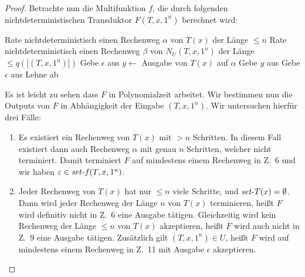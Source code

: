 \begin{proof}
    Betrachte nun die Multifunktion $f$, die durch folgenden nichtdeterministischen Transduktor $F(T, x, 1^n)$ berechnet wird:\par
    \begin{algorithm}[H]
        Rate nichtdeterministisch einen Rechenweg $\alpha$ von $T(x)$ der Länge $\leq n$\;
        Rate nichtdeterministisch einen Rechenweg $\beta$ von $N_U(T, x, 1^n)$ der Länge $\leq q(|(T, x, 1^n)|)$\;
        {
            Gebe $\epsilon$ aus\;
        }
        {
            $y\gets $ Ausgabe von $T(x)$ auf $\alpha$\;
            Gebe $y$ aus\;
        }
        {
            Gebe $\epsilon$ aus\;
        }
        \Else
        {
            Lehne ab\;
        }
    \end{algorithm}
    Es ist leicht zu sehen dass $F$ in Polynomialzeit arbeitet. 
    Wir bestimmen nun die Outputs von $F$  in Abhängigkeit der Eingabe $(T, x, 1^n)$.
    Wir untersuchen hierfür drei Fälle:
    \begin{enumerate}[label=\arabic*.]
        \item Es existiert ein Rechenweg von $T(x)$ mit $>n$ Schritten. In diesem Fall existiert dann auch Rechenweg $\alpha$ mit genau $n$ Schritten, welcher nicht terminiert. Damit terminiert $F$ auf mindestens einem Rechenweg in Z.~6 und wir haben $\varepsilon\in \mathit{set}\text{-}{f}(T, x, 1^n)$.
        \item Jeder Rechenweg von $T(x)$ hat nur $\leq n$ viele Schritte, und $\mathit{set}\text{-}{T}(x)=\emptyset$. 
            Dann wird jeder Rechenweg der Länge $n$ von $T(x)$ terminieren, heißt $F$ wird definitiv nicht in Z.~6 eine Ausgabe tätigen.
            Gleichzeitig wird kein Rechenweg der Länge $\leq n$ von $T(x)$ akzeptieren, heißt $F$ wird auch nicht in Z.~9 eine Ausgabe tätigen.
            Zusätzlich gilt $(T, x, 1^n)\in U$, heißt $F$ wird auf mindestens einem Rechenweg in Z.~11 mit Ausgabe $\epsilon$ akzeptieren.

\end{enumerate}
\end{proof}
